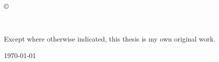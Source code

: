 \vspace*{14cm}
\begin{center}
  \makeatletter
  \copyright\ \@author{} \the\year
  \makeatother
\end{center}
\noindent
\begin{center}
  \footnotesize{~} %
\end{center}
\noindent

\newpage

\vspace*{7cm}
\begin{center}
  Except where otherwise indicated, this thesis is my own original
  work.
\end{center}

\vspace*{4cm}

\hspace{8cm}\makeatletter\@author\makeatother\par
\hspace{8cm}\today
